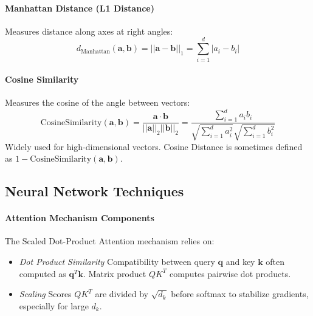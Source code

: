 \begin{appendices}
  \paragraph{Manhattan Distance (L1 Distance)}
  Measures distance along axes at right angles:
  \begin{equation}
    d_{\text{Manhattan}}(\bm{a}, \bm{b}) = ||\bm{a} - \bm{b}||_1 = \sum_{i=1}^d |a_i - b_i|
  \end{equation}

  \paragraph{Cosine Similarity}
  Measures the cosine of the angle between vectors:
  \begin{equation}
    \text{CosineSimilarity}(\bm{a}, \bm{b}) = \frac{\bm{a} \cdot \bm{b}}{||\bm{a}||_2 ||\bm{b}||_2} = \frac{\sum_{i=1}^d a_i b_i}{\sqrt{\sum_{i=1}^d a_i^2} \sqrt{\sum_{i=1}^d b_i^2}}
  \end{equation}
  Widely used for high-dimensional vectors. Cosine Distance is sometimes defined as $ 1 - \text{CosineSimilarity}(\bm{a}, \bm{b}) $.

  \subsection{Neural Network Techniques}
  \label{subsec:nn_techniques_app}

  \paragraph{Attention Mechanism Components}
  The Scaled Dot-Product Attention mechanism relies on:
  \begin{itemize}
    \item \textit{Dot Product Similarity} Compatibility between query $ \bm{q} $ and key $ \bm{k} $ often computed as $ \bm{q}^T \bm{k} $. Matrix product $ QK^T $ computes pairwise dot products.
    \item \textit{Scaling} Scores $ QK^T $ are divided by $ \sqrt{d_k} $ before softmax to stabilize gradients, especially for large $ d_k $.
  \end{itemize}


\end{appendices}
